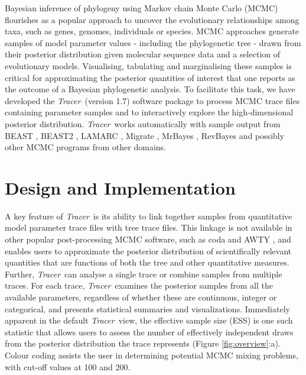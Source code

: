 \documentclass{bioinfo}
\newcommand{\tracer}{\emph{Tracer}}
\begin{document}
Bayesian inference of phylogeny using Markov chain Monte Carlo (MCMC) \citep{rannala1996probability, mau1999bayesian} flourishes as a popular approach to uncover the evolutionary relationships among taxa, such as genes, genomes, individuals or species.
MCMC approaches generate samples of model parameter values - including the phylogenetic tree - drawn from their posterior distribution given molecular sequence data and a selection of evolutionary models.
Visualising, tabulating and marginalising these samples is critical for approximating the posterior quantities of interest that one reports as the outcome of a Bayesian phylogenetic analysis.
To facilitate this task, we have developed the \tracer\ (version 1.7) software package to
process MCMC trace files containing parameter samples and to interactively explore the high-dimensional posterior distribution.
\tracer\ works automatically with sample output from BEAST \citep{drummond2012bayesian}, BEAST2 \citep{bouckaert2014beast2},  LAMARC \citep{kuhner2006lamarc},  Migrate \citep{beerli2006comparison}, MrBayes \citep{ronquist2012mrbayes}, RevBayes \citep{hohna2016revbayes} and possibly other MCMC programs from other domains.

\section*{Design and Implementation}

A key feature of \tracer\ is its ability to link together samples from quantitative model parameter trace files with tree trace files.
This linkage is not available in other popular post-processing MCMC software, such as coda \citep{plummer2006coda} and AWTY \citep{nylander2007awty}, and enables users to approximate the posterior distribution of scientifically relevant quantities that are functions of both the tree and other quantitative measures.
Further, \tracer\ can analyse a single trace or combine samples from multiple traces.
For each trace, \tracer\ examines the posterior samples from all the available parameters, regardless of whether these are continuous, integer or categorical, and presents statistical summaries and visualizations.
Immediately apparent in the default \tracer\ view, the effective sample size (ESS) is one such statistic that
allows users to assess the number of effectively independent draws from the posterior distribution the trace represents (Figure \ref{fig:overview}:a).
Colour coding assists the user in determining potential MCMC mixing problems, with cut-off values at 100 and 200.
\end{document}
